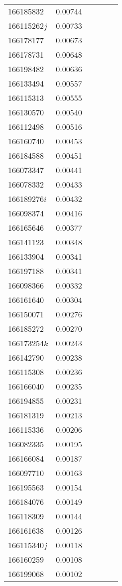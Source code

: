 \begin{landscape}
\begin{longtable}{p{1.6cm}p{1.2cm}p{1.5cm}p{1.5cm}p{2.8cm}p{13.5cm}}
166185832&0.00744&&&& \\
166115262$j$&0.00733&&&& \\
166178177&0.00673&&&& \\
166178731&0.00648&&&& \\
166198482&0.00636&&&& \\
166133494&0.00557&&&& \\
166115313&0.00555&&&& \\
166130570&0.00540&&&& \\
166112498&0.00516&&&& \\
166160740&0.00453&&&& \\
166184588&0.00451&&&& \\
166073347&0.00441&&&& \\
166078332&0.00433&&&& \\
166189276$i$&0.00432&&&& \\
166098374&0.00416&&&& \\
166165646&0.00377&&&& \\
166141123&0.00348&&&& \\
166133904&0.00341&&&& \\
166197188&0.00341&&&& \\
166098366&0.00332&&&& \\
166161640&0.00304&&&& \\
166150071&0.00276&&&& \\
166185272&0.00270&&&& \\
166173254$k$&0.00243&&&& \\
166142790&0.00238&&&& \\
166115308&0.00236&&&& \\
166166040&0.00235&&&& \\
166194855&0.00231&&&& \\
166181319&0.00213&&&& \\
166115336&0.00206&&&& \\
166082335&0.00195&&&& \\
166166084&0.00187&&&& \\
166097710&0.00163&&&& \\
166195563&0.00154&&&& \\
166184076&0.00149&&&& \\
166118309&0.00144&&&& \\
166161638&0.00126&&&& \\
166115340$j$&0.00118&&&& \\
166160259&0.00108&&&& \\
166199068&0.00102&&&& \\

\end{longtable}
\end{landscape}
